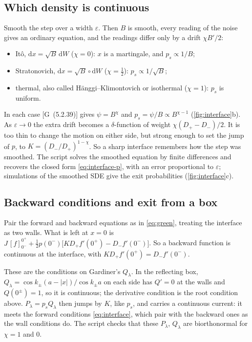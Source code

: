 \documentclass[11pt]{article}
\numberwithin{equation}{section}
\newcommand{\dd}{\mathrm{d}}
\newcommand{\G}[1]{[G~(#1)]}
\begin{document}
\subsection{Which density is continuous}
\label{sec:interface-conventions}

Smooth the step over a width $\varepsilon$. Then $B$ is smooth, every reading of the noise gives an ordinary
equation, and the readings differ only by a drift $\chi B'/2$:
\begin{itemize}
  \item It\^o, $\dd x=\sqrt B\,\dd W$ ($\chi=0$): $x$ is a martingale, and $p_s\propto1/B$;
  \item Stratonovich, $\dd x=\sqrt B\circ\dd W$ ($\chi=\frac12$): $p_s\propto1/\sqrt B$;
  \item thermal, also called H\"anggi--Klimontovich or isothermal ($\chi=1$): $p_s$ is uniform.
\end{itemize}
In each case \G{5.2.39} gives $\psi=B^\chi$ and $p_s=\psi/B\propto B^{\chi-1}$ (\cref{fig:interface}b). As
$\varepsilon\to0$ the extra drift becomes a $\delta$-function of weight $\chi(D_+-D_-)/2$. It is too thin to change
the motion on either side, but strong enough to set the jump of $p$, to $K=(D_-/D_+)^{1-\chi}$. So a sharp
interface remembers how the step was smoothed. The script solves the smoothed equation by finite differences and
recovers the closed form \cref{eq:interface-p}, with an error proportional to $\varepsilon$; simulations of the
smoothed SDE give the exit probabilities (\cref{fig:interface}c).

\subsection{Backward conditions and exit from a box}
\label{sec:interface-backward}

Pair the forward and backward equations as in \cref{eq:green}, treating the interface as two walls. What is left at
$x=0$ is $J\,[f]_{0^-}^{0^+}+\frac12p(0^-)\bigl[KD_+f'(0^+)-D_-f'(0^-)\bigr]$. So a backward function is continuous
at the interface, with $KD_+f'(0^+)=D_-f'(0^-)$.

These are the conditions on Gardiner's $Q_\lambda$. In the reflecting box, $Q_\lambda=\cos k_\pm(a-|x|)/\cos k_\pm a$
on each side has $Q'=0$ at the walls and $Q(0^\pm)=1$, so it is continuous; the derivative condition is the root
condition above. $P_\lambda=p_sQ_\lambda$ then jumps by $K$, like $p_s$, and carries a continuous current: it meets
the forward conditions \cref{eq:interface}, which pair with the backward ones as the wall conditions do. The script
checks that these $P_\lambda$, $Q_\lambda$ are biorthonormal for $\chi=1$ and $0$.
\end{document}
